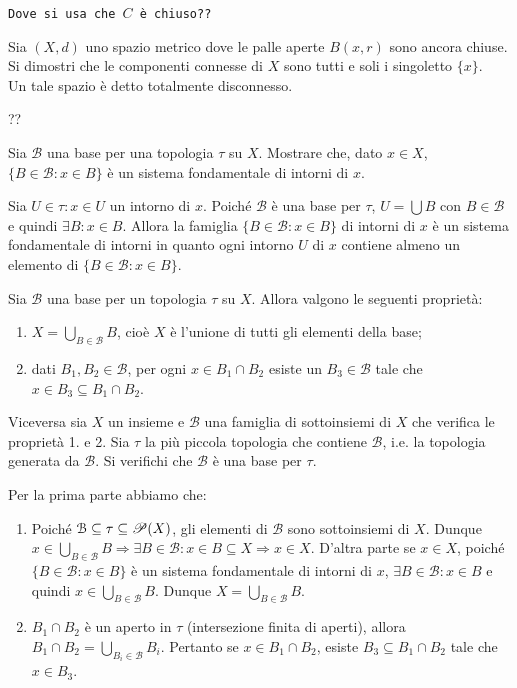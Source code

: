 \documentclass[a4paper]{article}\par \usepackage{style}\par
\begin{document}
\texttt{Dove si usa che $ C $ è chiuso??}\par \begin{es}
  Sia $ (X, d) $ uno spazio metrico dove le palle aperte $ B(x, r) $ sono ancora chiuse. Si dimostri che le componenti connesse di $ X $ sono tutti e soli i singoletto $ \{x\} $. \\
  Un tale spazio è detto totalmente disconnesso.
\end{es}\par ??\par \begin{es}
  Sia $ \mathcal{B} $ una base per una topologia $ \tau $ su $ X $. Mostrare che, dato $ x \in X $, $ \{B \in \mathcal{B} : x \in B\} $ è un sistema fondamentale di intorni di $ x $.
\end{es}\par Sia $ U \in \tau : x \in U $ un intorno di $ x $. Poiché $ \mathcal{B} $ è una base per $ \tau $, $ U = \bigcup B $ con $ B \in \mathcal{B} $ e quindi $ \exists B : x \in B $. Allora la famiglia $ \{B \in \mathcal{B} : x \in B\} $ di intorni di $ x $ è un sistema fondamentale di intorni in quanto ogni intorno $ U $ di $ x $ contiene almeno un elemento di $ \{B \in \mathcal{B} : x \in B\} $.\par \begin{es}
  Sia $ \mathcal{B} $ una base per un topologia $ \tau $ su $ X $. Allora valgono le seguenti proprietà:
  \begin{enumerate}
  \item $ X = \bigcup_{B \in \mathcal{B}} B $, cioè $ X $ è l'unione di tutti gli elementi della base;
  \item dati $ B_1, B_2 \in \mathcal{B} $, per ogni $ x \in B_1 \cap B_2 $ esiste un $ B_3 \in \mathcal{B} $ tale che $ x \in B_3 \subseteq B_1 \cap B_2 $.
  \end{enumerate}
  Viceversa sia $ X $ un insieme e $ \mathcal{B} $ una famiglia di sottoinsiemi di $ X $ che verifica le proprietà 1. e 2. Sia $ \tau $ la più piccola topologia che contiene $ \mathcal{B} $, i.e. la topologia generata da $ \mathcal{B} $. Si verifichi che $ \mathcal{B} $ è una base per $ \tau $.
\end{es}\par Per la prima parte abbiamo che:
\begin{enumerate}
\item Poiché $ \mathcal{B} \subseteq \tau \subseteq \P(X) $, gli elementi di $ \mathcal{B} $ sono sottoinsiemi di $ X $. Dunque $ x \in \bigcup_{B \in \mathcal{B}} B \Rightarrow \exists B \in \mathcal{B} : x \in B \subseteq X \Rightarrow x \in X $. D'altra parte se $ x \in X $, poiché $ \{B \in \mathcal{B} : x \in B\} $ è un sistema fondamentale di intorni di $ x $, $ \exists B \in \mathcal{B} : x \in B $ e quindi $ x \in \bigcup_{B \in \mathcal{B}} B $. Dunque $ X = \bigcup_{B \in \mathcal{B}} B $.
\item $ B_1 \cap B_2 $ è un aperto in $ \tau $ (intersezione finita di aperti), allora $ B_1 \cap B_2 = \bigcup_{B_i \in \mathcal{B}} B_i $. Pertanto se $ x \in B_1 \cap B_2 $, esiste $ B_3 \subseteq B_1 \cap B_2 $ tale che $ x \in B_3 $.
\end{enumerate}
\end{document}

